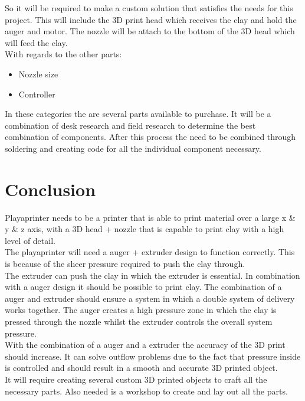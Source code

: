 \documentclass[11pt]{article}
\begin{document}
 So it will be required to make a custom solution that satisfies the needs for this project. This will include the 3D print head which receives the clay and hold the auger and motor. The nozzle will be attach to the bottom of the 3D head which will feed the clay. \\
 
 
 With regards to the other parts:
 
 	\begin{itemize}
 		\item Nozzle size
 		\item Controller
	\end{itemize} 	 
 
In these categories the are several parts available to purchase. It will be a combination of desk research and field research to determine the best combination of components. After this process the need to be combined through soldering and creating code for all the individual component necessary.
 \newpage
 
 
\section{Conclusion }

Playaprinter needs to be a printer that is able to print material over a large x \& y \& z axis, with a 3D head + nozzle that is capable to print clay with a high level of detail. \\

 The playaprinter will need a auger + extruder design to function correctly. This is because of the sheer pressure required to push the clay through.\\
 
  The extruder can push the clay in which the extruder is essential. In combination with a auger design it should be possible to print clay. The combination of a auger and extruder should ensure a system in which a double system of delivery  works together. The auger creates a high pressure zone in which the clay is pressed through the nozzle whilst the extruder controls the overall system pressure. \\

 With the combination of a auger and a extruder the accuracy of the 3D print should increase. It can solve outflow problems due to the fact that pressure inside is controlled and should result in a smooth and accurate 3D printed object. \\
 
It will require creating several custom 3D printed objects to craft all the necessary parts.   Also needed is a workshop to create and lay out all the parts.\\
\end{document}
